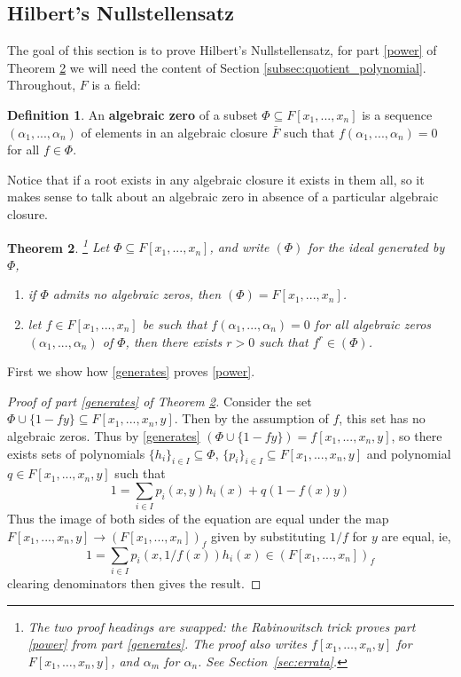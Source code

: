 \documentclass[12pt]{article}
\theoremstyle{plain}
\newtheorem{thm}{Theorem}[subsection] %
\theoremstyle{definition}
\newtheorem{defn}[thm]{Definition} %
\begin{document}
\subsection{Hilbert's Nullstellensatz}
The goal of this section is to prove Hilbert's Nullstellensatz, for part \ref{power} of Theorem \ref{thm:hilbertsnullstellensatz} we will need the content of Section \ref{subsec:quotient_polynomial}. Throughout, $F$ is a field:
\begin{defn}
\label{def:algzero}
An \textbf{algebraic zero} of a subset $\Phi \subseteq F[x_1,...,x_n]$ is a sequence $(\alpha_1,...,\alpha_n)$ of elements in an algebraic closure $\bar{F}$ such that $f(\alpha_1,...,\alpha_n) = 0$ for all $f \in \Phi$.
\end{defn}
Notice that if a root exists in any algebraic closure it exists in them all, so it makes sense to talk about an algebraic zero in absence of a particular algebraic closure.
\begin{thm}
\label{thm:hilbertsnullstellensatz}\footnote{The two proof headings are swapped: the Rabinowitsch trick proves part \ref{power} from part \ref{generates}. The proof also writes $f[x_1,\ldots,x_n,y]$ for $F[x_1,\ldots,x_n,y]$, and $\alpha_m$ for $\alpha_n$. See Section~\ref{sec:errata}.}
Let $\Phi \subseteq F[x_1,...,x_n]$, and write $(\Phi)$ for the ideal generated by $\Phi$,
\begin{enumerate}
    \item\label{generates} if $\Phi$ admits no algebraic zeros, then $(\Phi) = F[x_1,...,x_n]$.
    \item\label{power} let $f \in F[x_1,...,x_n]$ be such that $f(\alpha_1,...,\alpha_n) = 0$ for all algebraic zeros $(\alpha_1,...,\alpha_n)$ of $\Phi$, then there exists $r > 0$ such that $f^r \in (\Phi)$.
\end{enumerate}
\end{thm}
First we show how \ref{generates} proves \ref{power}.
\begin{proof}[Proof of part \ref{generates} of Theorem \ref{thm:hilbertsnullstellensatz}]
Consider the set $\Phi \cup \lbrace 1 - fy\rbrace \subseteq F[x_1,...,x_n,y]$. Then by the assumption of $f$, this set has no algebraic zeros. Thus by \ref{generates} $(\Phi \cup \lbrace 1 - fy\rbrace) = f[x_1,...,x_n,y]$, so there exists sets of polynomials $\lbrace h_i\rbrace_{i \in I} \subseteq \Phi$, $\lbrace p_i\rbrace_{i \in I} \subseteq F[x_1,...,x_n,y]$ and polynomial $q \in F[x_1,...,x_n,y]$ such that
\[1 = \sum_{i \in I}p_i(x,y)h_i(x) + q(1 - f(x)y)\]
Thus the image of both sides of the equation are equal under the map $F[x_1,...,x_n,y] \to (F[x_1,...,x_n])_f$ given by substituting $1/f$ for $y$ are equal, ie,
\[1 = \sum_{i \in I}p_i(x,1/f(x))h_i(x) \in (F[x_1,...,x_n])_f\]
clearing denominators then gives the result.
\end{proof}
\end{document}
